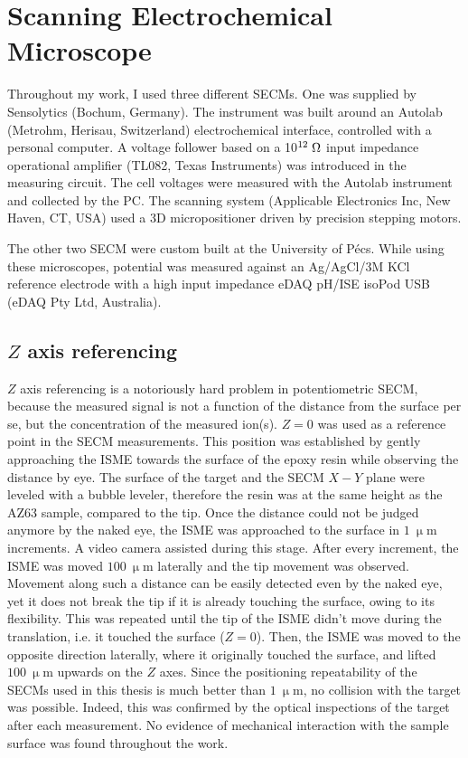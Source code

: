 	\section{Scanning Electrochemical Microscope}
Throughout my work, I used three different SECMs.
One was supplied by Sensolytics (Bochum, Germany).
The instrument was built around an Autolab (Metrohm, Herisau, Switzerland) electrochemical interface, controlled with a personal computer.
A voltage follower based on a 10$^{12}\; \ohm$ input impedance operational amplifier (TL082, Texas Instruments) was introduced in the measuring circuit.
The cell voltages were measured with the Autolab instrument and collected by the PC.
The scanning system (Applicable Electronics Inc, New Haven, CT, USA) used a 3D micropositioner driven by precision stepping motors.

The other two SECM were custom built at the University of Pécs.
While using these microscopes, potential was measured against an Ag/AgCl/3M KCl reference electrode with a high input impedance eDAQ pH/ISE isoPod USB (eDAQ Pty Ltd, Australia).

\subsection{$Z$ axis referencing}
$Z$ axis referencing is a notoriously hard problem in potentiometric SECM, because the measured signal is not a function of the distance from the surface per se, but the concentration of the measured ion(s). $Z=0$ was used as a reference point in the SECM measurements. This position was established by gently approaching the ISME towards the surface of the epoxy resin while observing the distance by eye. The surface of the target and the SECM $X-Y$ plane were leveled with a bubble leveler, therefore the resin was at the same height as the AZ63 sample, compared to the tip. Once the distance could not be judged anymore by the naked eye, the ISME was approached to the surface in $1~\upmu$m increments. A video camera assisted during this stage. After every increment, the ISME was moved $100~\upmu$m laterally and the tip movement was observed. Movement along such a distance can be easily detected even by the naked eye, yet it does not break the tip if it is already touching the surface, owing to its flexibility. This was repeated until the tip of the ISME didn’t move during the translation, i.e. it touched the surface ($Z=0$). Then, the ISME was moved to the opposite direction laterally, where it originally touched the surface, and lifted $100~\upmu$m upwards on the $Z$ axes. Since the positioning repeatability of the SECMs used in this thesis is much better than $1~\upmu$m, no collision with the target was possible. Indeed, this was confirmed by the optical inspections of the target after each measurement. No evidence of mechanical interaction with the sample surface was found throughout the work.

